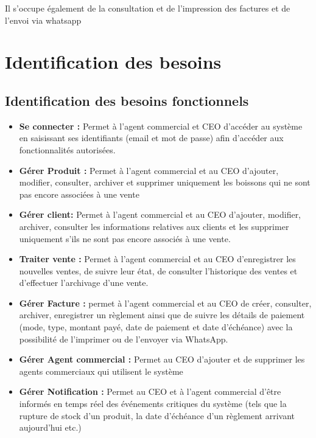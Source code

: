 Il s'occupe également de la consultation et de l'impression des factures et de l'envoi via whatsapp

\section{Identification des besoins}

\subsection{Identification des besoins fonctionnels}
\begin{itemize}


\item \textbf{Se connecter :} Permet à l'agent commercial et CEO d'accéder au système en saisissant ses identifiants (email et mot de passe) afin d'accéder aux fonctionnalités autorisées.

\item \textbf{Gérer Produit :} Permet à l'agent commercial et au CEO d'ajouter, modifier, consulter, archiver et supprimer uniquement les boissons qui ne sont pas encore associées à une vente

\item \textbf{Gérer client:} Permet à l'agent commercial et au CEO d'ajouter, modifier, archiver, consulter les informations relatives aux clients et les supprimer uniquement s'ils ne sont pas encore associés à une vente.

\item \textbf{Traiter vente :} Permet à l'agent commercial et au CEO d'enregistrer les nouvelles ventes, de suivre leur état, de consulter l'historique des ventes et d'effectuer l'archivage d'une vente.

\item \textbf{Gérer Facture :} permet à l'agent commercial et au CEO de créer, consulter, archiver, enregistrer un règlement ainsi que de suivre les détails de paiement (mode, type, montant payé, date de paiement et date d'échéance) avec la possibilité de l'imprimer ou de l'envoyer via WhatsApp.

\item \textbf{Gérer Agent commercial :} Permet au CEO d'ajouter et de supprimer les agents commerciaux qui utilisent le système 

\item \textbf{Gérer Notification :} Permet au CEO et à l'agent commercial d'être informés en temps réel des événements critiques du système (tels que la rupture de stock d'un produit, la date d'échéance d'un règlement arrivant aujourd'hui etc.) 


\end{itemize}

